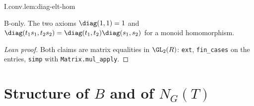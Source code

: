 \begin{lemma}
\bonly
{}
\end{lemma}
\begin{tfformal}{I.conv.lem:diag-elt-hom}
\begin{tffidelity}
B-only. The two axioms $\diag(1,1)=1$ and $\diag(t_1s_1,t_2s_2)=\diag(t_1,t_2)\diag(s_1,s_2)$ for a monoid homomorphism.
\end{tffidelity}
\end{tfformal}
\begin{proof}[Lean proof]
Both claims are matrix equalities in $\GL_2(R)$: \texttt{ext}, \texttt{fin\_cases} on the entries, \texttt{simp} with \texttt{Matrix.mul\_apply}.
\end{proof}

\section{\texorpdfstring{Structure of $B$ and of $N_G(T)$}{Structure of B and of NG(T)}}

